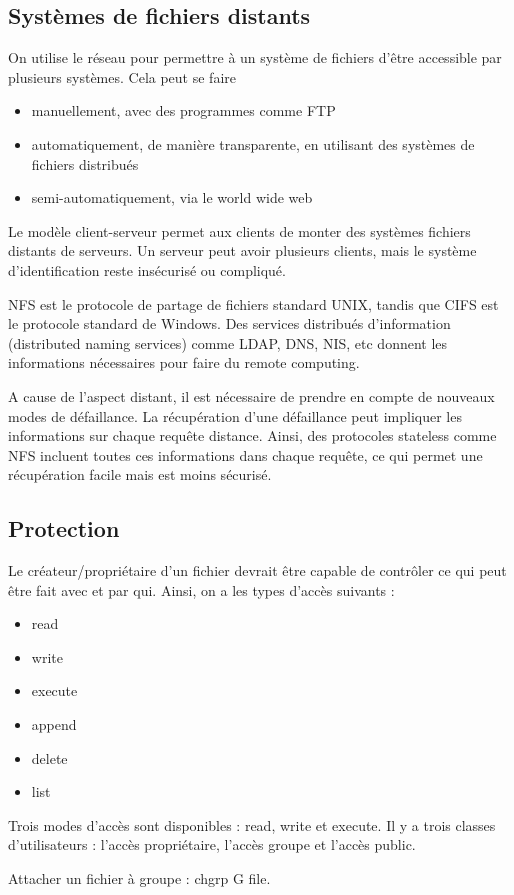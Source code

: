 	\subsection{Systèmes de fichiers distants}
	
	On utilise le réseau pour permettre à un système de fichiers d'être accessible par plusieurs systèmes. Cela peut se faire
	
	\begin{itemize}
		\item manuellement, avec des programmes comme FTP
		\item automatiquement, de manière transparente, en utilisant des systèmes de fichiers distribués
		\item semi-automatiquement, via le world wide web
	\end{itemize}
	
	Le modèle client-serveur permet aux clients de monter des systèmes fichiers distants de serveurs. Un serveur peut avoir plusieurs clients, mais le système d'identification reste insécurisé ou compliqué.
	
	NFS est le protocole de partage de fichiers standard UNIX, tandis que CIFS est le protocole standard de Windows. Des services distribués d'information (distributed naming services) comme LDAP, DNS, NIS, etc donnent les informations nécessaires pour faire du remote computing.
	
	A cause de l'aspect distant, il est nécessaire de prendre en compte de nouveaux modes de défaillance.  La récupération d'une défaillance peut impliquer les informations sur chaque requête distance. Ainsi, des protocoles stateless comme NFS incluent toutes ces informations dans chaque requête, ce qui permet une récupération facile mais est moins sécurisé.
	
	
	\subsection{Protection}
	
	Le créateur/propriétaire d'un fichier devrait être capable de contrôler ce qui peut être fait avec et par qui. Ainsi, on a les types d'accès suivants :
	
	\begin{itemize}
		\item read
		\item write
		\item execute
		\item append
		\item delete
		\item list
	\end{itemize}
	
	Trois modes d'accès sont disponibles : read, write et execute. Il y a trois classes d'utilisateurs : l'accès propriétaire, l'accès groupe et l'accès public.
	
	Attacher un fichier à groupe : chgrp G file.